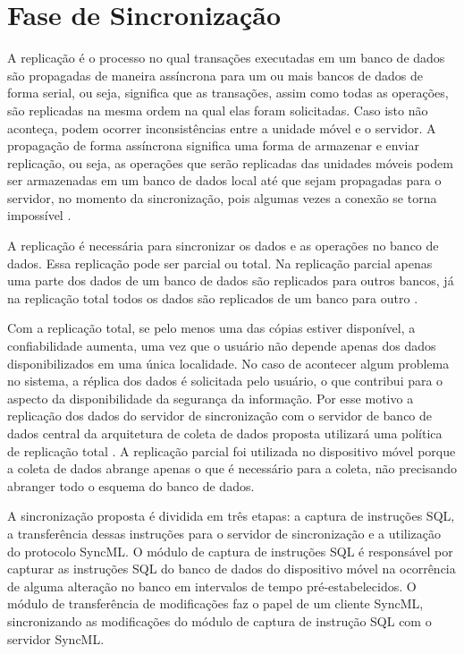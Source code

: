 \chapter{Fase de Sincronização}

A replicação é o processo no qual transações executadas em um banco de dados são propagadas de maneira assíncrona para um ou mais bancos de dados de forma serial, ou seja, significa que as transações, assim como todas as operações, são replicadas na mesma ordem na qual elas foram solicitadas. Caso isto não aconteça, podem ocorrer inconsistências entre a unidade móvel e o servidor. A propagação de forma assíncrona significa uma forma de armazenar e enviar replicação, ou seja, as operações que serão replicadas das unidades móveis podem ser armazenadas em um banco de dados local até que sejam propagadas para o servidor, no momento da sincronização, pois algumas vezes a conexão se torna impossível \cite{Rennhackkamp} \cite{ito}.

A replicação é necessária para sincronizar os dados e as operações no banco de dados. Essa replicação pode ser parcial ou total. Na replicação parcial apenas uma parte dos dados de um banco de dados são replicados para outros bancos, já na replicação total todos os dados são replicados de um banco para outro \cite{ito} \cite{elmasri}.

Com a replicação total, se pelo menos uma das cópias estiver disponível, a confiabilidade aumenta, uma vez que o usuário não depende apenas dos dados disponibilizados em uma única localidade. No caso de acontecer algum problema no sistema, a réplica dos dados é solicitada pelo usuário, o que contribui para o aspecto da disponibilidade da segurança da informação. Por esse motivo a replicação dos dados do servidor de sincronização com o servidor de banco de dados central da arquitetura de coleta de dados proposta utilizará uma política de replicação total \cite{ito}. A replicação parcial foi utilizada no dispositivo móvel porque a coleta de dados abrange apenas o que é necessário para a coleta, não precisando abranger todo o esquema do banco de dados.

A sincronização proposta é dividida em três etapas: a captura de instruções SQL, a transferência dessas instruções para o servidor de sincronização e a utilização do protocolo SyncML. O módulo de captura de instruções SQL é responsável por capturar as instruções SQL do banco de dados do dispositivo móvel na ocorrência de alguma alteração no banco em intervalos de tempo pré-estabelecidos. O módulo de transferência de modificações faz o papel de um cliente SyncML, sincronizando as modificações do módulo de captura de instrução SQL com o servidor SyncML.

